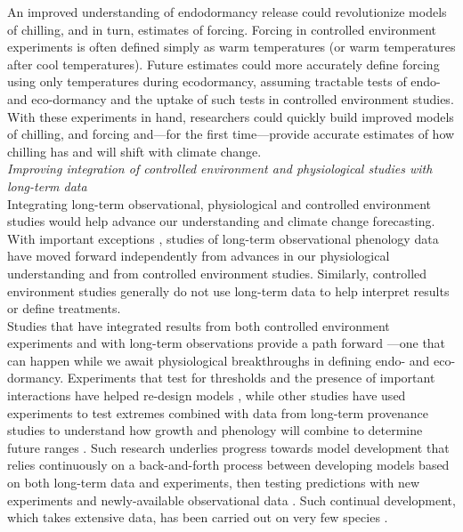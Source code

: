 \documentclass[11pt,letter]{article}
\begin{document}
An improved understanding of endodormancy release could revolutionize models of chilling, and in turn, estimates of forcing. Forcing in controlled environment experiments is often defined simply as warm temperatures (or warm temperatures after cool temperatures). Future estimates could more accurately define forcing using only temperatures during ecodormancy, assuming tractable tests of endo- and eco-dormancy and the uptake of such tests in controlled environment studies. With these experiments in hand, researchers could quickly build improved models of chilling, and forcing and---for the first time---provide accurate estimates of how chilling has and will shift with climate change.\\ 

\emph{Improving integration of controlled environment and physiological studies with long-term data}\\
Integrating long-term observational, physiological and controlled environment studies would help advance our understanding and climate change forecasting. With important exceptions \citep[e.g.,][]{gauzere2017}, studies of long-term observational phenology data have moved forward independently from advances in our physiological understanding and from controlled environment studies. Similarly, controlled environment studies generally do not use long-term data to help interpret results or define treatments. \\

Studies that have integrated results from both controlled environment experiments and with long-term observations provide a path forward \citep{Caffarra:2011qf,nagano2012,satake2013,ford2016,chuinearees}---one that can happen while we await physiological breakthroughs in defining endo- and eco-dormancy. Experiments that test for thresholds and the presence of important interactions have helped re-design models \citep{Caffarra:2011qf,chuinearees}, while other studies have used experiments to test extremes combined with data from long-term provenance studies to understand how growth and phenology will combine to determine future ranges \citep{ford2016}. Such research underlies progress towards model development that relies continuously on a back-and-forth process between developing models based on both long-term data and experiments, then testing predictions with new experiments and newly-available observational data \citep[i.e., more years and also data from new locations,][]{nagano2012,satake2013}. Such continual development, which takes extensive data, has been carried out on very few species \citep[e.g., \emph{Arabidopsis thaliana}, \emph{Oryza sativa} (rice), \emph{Arabidopsis halleri},][]{Wilczek:2009oa,nagano2012,satake2013}.\\
\end{document}
